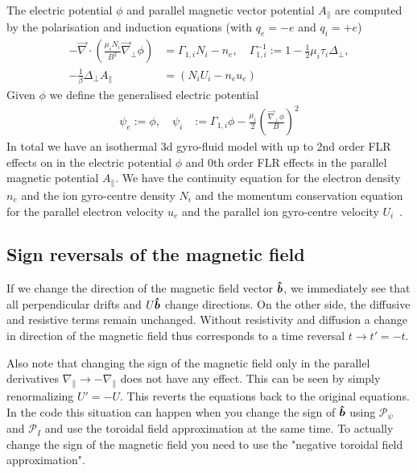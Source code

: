 The electric potential \(\phi\) and parallel magnetic vector potential \(A_\parallel\) are
computed by the polarisation and induction equations (with $q_e=-e$ and $q_i=+e$)
\begin{align}
 -\vec{\nabla} \cdot\left(\frac{\mu_iN_i}{B^2} \vec{\nabla}_\perp \phi\right) &=  \Gamma_{1,i} N_i -n_e, \quad \Gamma_{1,i}^{-1} := 1-\frac{1}{2}\mu_i\tau_i\Delta_\perp , \\
  -\frac{1}{\beta} \Delta_\perp A_\parallel &= \left(N_i U_i-n_e u_e \right)
  \label{eq:polarisation_dimensional}
\end{align}
Given $\phi$ we define the generalised electric potential
\begin{align}
    \psi_e := \phi,\quad \psi_i&:= \Gamma_{1,i} \phi - \frac{\mu_i }{2}\left(\frac{\vec \nabla_\perp\phi}{B}\right)^2
\end{align}
In total 
we have an isothermal 3d gyro-fluid model with up to 2nd order FLR effects
on in the electric potential $\phi$ and 0th order FLR effects in the parallel magnetic
potential $A_\parallel$.
We have the continuity equation for the electron density \(n_e\) and the ion gyro-centre
density \(N_i\) and the momentum conservation equation for
the parallel electron velocity \(u_e\) and the parallel ion gyro-centre velocity \(U_i\)~\cite{WiesenbergerPhD, HeldPhD}.
\subsection{ Sign reversals of the magnetic field}\label{sec:field_reversal}
If we change the direction of the magnetic field vector $\bm{\hat{b}}$, we immediately see that all perpendicular
drifts and $U\bm{\hat{b}}$ change directions. On the other side, the diffusive and resistive terms remain unchanged.
Without resistivity and diffusion a change in direction of the magnetic field thus corresponds to
a time reversal $t\rightarrow t'=-t$.

Also note that changing the sign of the magnetic field only in the parallel derivatives $\nabla_\parallel \rightarrow -\nabla_\parallel$ does not
have any effect. This can be seen by simply renormalizing $U'=-U$. This reverts the equations back to the original equations.
In the code this situation can happen when you change the sign of $\bm{\hat{b}}$ using $\mathcal P_\psi$  and $\mathcal P_I$
and use the toroidal field approximation at the same time.
To actually change the sign of the magnetic field you need to use the "negative toroidal field approximation".


